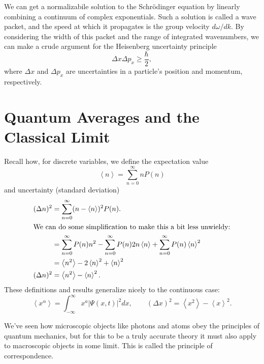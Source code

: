 \documentclass[../p052main.tex]{subfiles}
\begin{document}
\begin{summary}
    We can get a normalizabile solution to the Schrödinger equation by linearly combining a continuum of complex exponentials.
    Such a solution is called a wave packet, and the speed at which it propagates is the group velocity $d \omega / dk$.
    By considering the width of this packet and the range of integrated wavenumbers, we can make a crude argument for the Heisenberg uncertainty principle
    \[ \Delta x \Delta p_x \geq \frac{\hbar}{2}, \]
    where $\Delta x$ and $\Delta p_x$ are uncertainties in a particle's position and momentum, respectively.
\end{summary}

\section{Quantum Averages and the Classical Limit}
Recall how, for discrete variables, we define the expectation value
\[ \left< n \right> = \sum_{n=0}^{\infty} nP(n) \]
and uncertainty (standard deviation)
\begin{align*}
    (\Delta n)^2 &= \sum_{n=0}^{\infty} (n - \left< n \right>)^2P(n). \\
    \intertext{We can do some simplification to make this a bit less unwieldy:}
    &= \sum_{n=0}^{\infty} P(n) n^2 - \sum_{n=0}^{\infty} P(n) 2n\left< n \right> + \sum_{n=0}^{\infty}P(n) \left< n \right>^2 \\
    &= \left< n^2 \right> - 2\left< n \right>^2 + \left< n \right>^2 \\
    (\Delta n)^2 &= \left< n^2 \right> - \left< n \right>^2.
\end{align*}
These definitions and results generalize nicely to the continuous case:
\[ \left< x^{\alpha} \right> = \int_{-\infty}^{\infty} x^{a} |\Psi(x,t)|^2 dx, \qquad (\Delta x)^2 = \left< x^2 \right> - \left< x \right>^2. \]

We've seen how microscopic objects like photons and atoms obey the principles of quantum mechanics, but for this to be a truly accurate theory it must also apply to macroscopic objects in some limit.
This is called the principle of correspondence.
\end{document}
